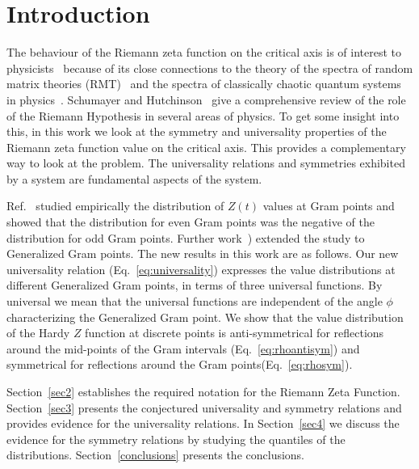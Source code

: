 \documentclass[twoside]{article}
\begin{document}
\section{Introduction}
The behaviour of the Riemann zeta function on the critical axis is of interest to 
physicists~\cite{Shanker 2006} because of
its close connections  to the theory of the spectra of random matrix theories 
(RMT)~\cite{Wigner 1967, Gaudin 1960, Gaudin 1961, Dyson 1962, Bogomolny 1995, Bogomolny 1996, Katz 1999, Keating 2000a, Keating 2000b, Conrey 2000, 
Hughes 2000, Hughes 2001, Conrey 2002, Conrey 2003} 
and the spectra of classically chaotic quantum systems in 
physics~\cite{Berry 1985,Berry 1986,Berry 1987,Berry 1988}. Schumayer and
Hutchinson~\cite{Schumayer 2011} give a comprehensive review of the role
of the Riemann Hypothesis in several areas of physics.
To get some insight into this, 
in this work
we look at the symmetry and universality properties of the Riemann zeta function value 
on the critical axis. This provides a complementary way to look at the problem.
The universality relations and symmetries exhibited by a system are fundamental aspects of the system. 

Ref.~\cite{Shanker 2018a} studied empirically the distribution of $Z(t)$ values at 
Gram points and
showed  that the distribution for even Gram points was the negative  of the 
distribution for odd Gram points. 
Further work~\cite{Shanker 2018b}) extended the study to Generalized Gram points. 
The new results in this work are as follows. 
Our new universality relation (Eq.~\ref{eq:universality}) expresses the value distributions 
at different Generalized Gram points, in terms of three universal functions.
By universal we mean that the universal functions are independent of the angle $\phi$
characterizing the  Generalized Gram point.
We show that the  value
distribution of the Hardy $Z$ function at discrete points is anti-symmetrical 
for reflections around the mid-points 
of the Gram intervals (Eq.~\ref{eq:rhoantisym}) and symmetrical for reflections 
around the Gram points(Eq.~\ref{eq:rhosym}). 

Section~\ref{sec2} establishes the required notation for the 
Riemann Zeta Function. 
Section~\ref{sec3} presents the conjectured universality and symmetry relations
and provides evidence for the universality relations.
In Section~\ref{sec4} we discuss the evidence for the symmetry relations
by studying the quantiles of the distributions.
Section~\ref{conclusions} presents the conclusions. 
\end{document}
